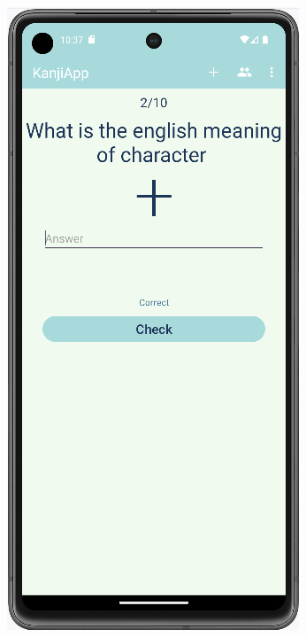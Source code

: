 \documentclass[a4paper,twoside,12pt]{book}
\begin{document}
\begin{figure}
\hfill
\begin{subfigure}{0.3\textwidth}
   \includegraphics[width=\textwidth]{learn/correct}

\end{subfigure}
\end{figure}
\end{document}
